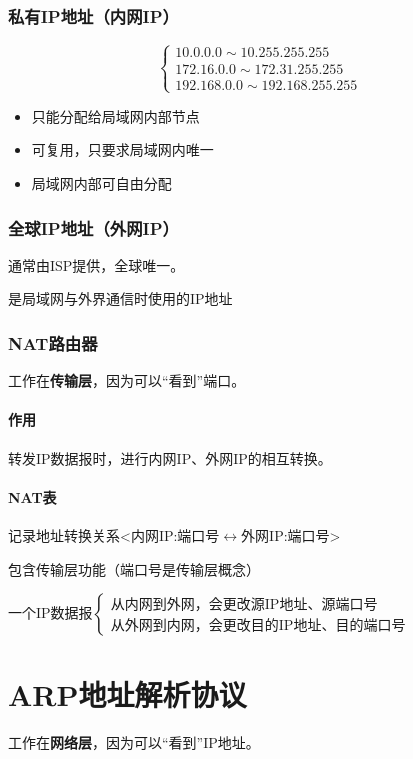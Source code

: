 \subsubsection{私有IP地址（内网IP）}
\[\begin{cases}
    10.0.0.0 \sim 10.255.255.255 \\
    172.16.0.0 \sim 172.31.255.255 \\
    192.168.0.0 \sim 192.168.255.255
\end{cases}\]
\begin{itemize}
    \item 只能分配给局域网内部节点
    \item 可复用，只要求局域网内唯一
    \item 局域网内部可自由分配
\end{itemize}


\subsubsection{全球IP地址（外网IP）}
通常由ISP提供，全球唯一。

是局域网与外界通信时使用的IP地址


\subsubsection{NAT路由器}
工作在\textbf{传输层}，因为可以“看到”端口。

\paragraph{作用}
转发IP数据报时，进行内网IP、外网IP的相互转换。

\paragraph{NAT表}
记录地址转换关系<内网IP:端口号\(\leftrightarrow\)外网IP:端口号>

包含传输层功能（端口号是传输层概念）

一个IP数据报\(\begin{cases}
    \text{从内网到外网，会更改源IP地址、源端口号} \\ 
    \text{从外网到内网，会更改目的IP地址、目的端口号}
\end{cases}\)


\section{ARP地址解析协议}
工作在\textbf{网络层}，因为可以“看到”IP地址。

